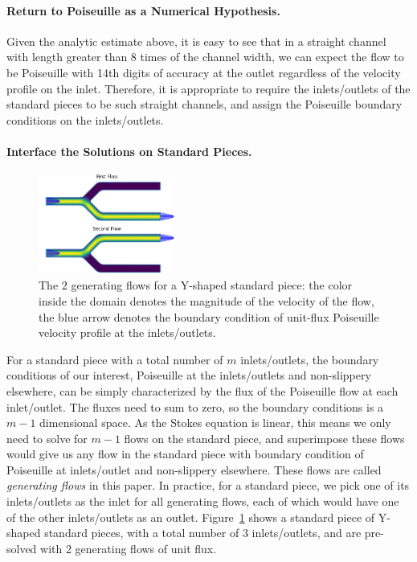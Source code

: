\documentclass[10pt,twocolumn,letterpaper]{article}
\begin{document}
\paragraph{Return to Poiseuille as a Numerical Hypothesis.}
Given the analytic estimate above, 
it is easy to see that in a straight channel with length greater than 
8 times of the channel width, 
we can expect the flow to be Poiseuille with 14th digits of accuracy 
at the outlet regardless of the velocity profile on the inlet. 
Therefore, it is appropriate to require the inlets/outlets of 
the standard pieces to be such straight channels, 
and assign the Poiseuille boundary conditions on the inlets/outlets.


\paragraph{Interface the Solutions on Standard Pieces.}

\begin{figure}[!ht]
  \centering
  \includegraphics[width=0.4\textwidth]{pic/standard_pipe_flows_demo.png}
  \caption{The 2 generating flows for a Y-shaped standard piece: 
  the color inside the domain denotes the magnitude of the velocity of the flow, 
  the blue arrow denotes the boundary condition of unit-flux Poiseuille velocity profile at the inlets/outlets.}\label{fig:y_2_flows}
\end{figure}

For a standard piece with a total number of $m$ inlets/outlets, 
the boundary conditions of our interest, 
Poiseuille at the inlets/outlets and non-slippery elsewhere, 
can be simply characterized by the flux of the Poiseuille flow at each inlet/outlet. 
The fluxes need to sum to zero, so the boundary conditions is a $m-1$ dimensional space. 
As the Stokes equation is linear, 
this means we only need to solve for $m-1$ flows on the standard piece, 
and superimpose these flows would give us any flow in the standard piece 
with boundary condition of Poiseuille at inlets/outlet and non-slippery elsewhere. 
These flows are called \textit{generating flows} in this paper. 
In practice, for a standard piece, 
we pick one of its inlets/outlets as the inlet for all generating flows, 
each of which would have one of the other inlets/outlets as an outlet. 
Figure~\ref{fig:y_2_flows} shows a standard piece of Y-shaped standard pieces, 
with a total number of 3 inlets/outlets, 
and are pre-solved with 2 generating flows of unit flux. 
\end{document}
